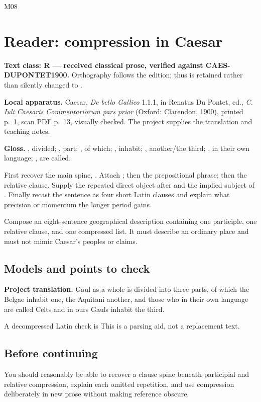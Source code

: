 \begin{courseunit}{M08}
\chapter{Reader: compression in Caesar}

\textbf{Text class: R --- received classical prose, verified against
CAES-DUPONTET1900.} Orthography follows the edition; thus 
is retained rather than silently changed to .

\ReaderCaesarGallia

\textbf{Local apparatus.} Caesar, \textit{De bello Gallico} 1.1.1, in Renatus
Du Pontet, ed., \textit{C. Iuli Caesaris Commentariorum pars prior} (Oxford:
Clarendon, 1900), printed p.~1, scan PDF p.~13, visually checked.  The project
supplies the translation and teaching notes.

\textbf{Gloss.} , divided; , part;
, of which; , inhabit; ,
another/the third; , in their own language;
, are called.

First recover the main spine, .  Attach
; then the prepositional phrase; then the relative clause.  Supply
the repeated direct object after  and the implied subject of
.  Finally recast the sentence as four short Latin clauses
and explain what precision or momentum the longer period gains.

Compose an eight-sentence geographical description containing one participle,
one relative clause, and one compressed list.  It must describe an ordinary
place and must not mimic Caesar's peoples or claims.

\ifsolutions
\section{Models and points to check}
\textbf{Project translation.} Gaul as a whole is divided into three parts, of
which the Belgae inhabit one, the Aquitani another, and those who in their own
language are called Celts and in ours Gauls inhabit the third.

A decompressed Latin check is   This is a parsing aid,
not a replacement text.
\else
\section{Before continuing}
You should reasonably be able to recover a clause spine beneath participial
and relative compression, explain each omitted repetition, and use compression
deliberately in new prose without making reference obscure.
\fi
\end{courseunit}

